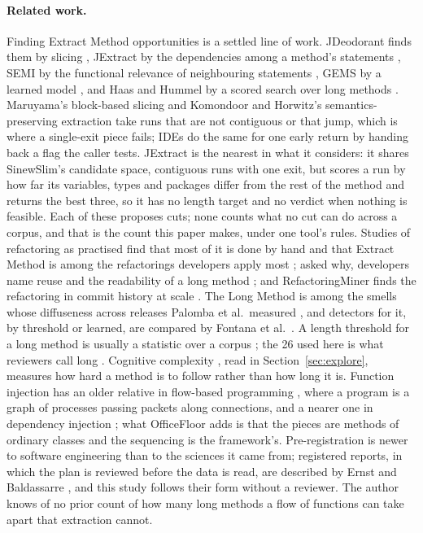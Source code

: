 \documentclass[11pt,a4paper]{article}
\begin{document}
\paragraph{Related work.} Finding Extract Method opportunities is a settled
line of work. JDeodorant finds them by slicing \cite{tsantalis2011}, JExtract
by the dependencies among a method's statements \cite{silva2014}, SEMI by the
functional relevance of neighbouring statements \cite{charalampidou2017},
GEMS by a learned model \cite{xu2017}, and Haas and Hummel by a scored search
over long methods \cite{haas2016}. Maruyama's block-based slicing
\cite{maruyama2001} and Komondoor and Horwitz's semantics-preserving
extraction \cite{komondoor2000} take runs that are not contiguous or that
jump, which is where a single-exit piece fails; IDEs do the same for one
early return by handing back a flag the caller tests. JExtract is the
nearest in what it considers: it shares SinewSlim's candidate space,
contiguous runs with one exit, but scores a run by how far its variables,
types and packages differ from the rest of the method and returns the best
three, so it has no length target and no verdict when nothing is feasible.
Each of these proposes cuts; none counts what no cut can do across a corpus,
and that is the count this paper makes, under one tool's rules. Studies of refactoring as practised
find that most of it is done by hand and that Extract Method is among the
refactorings developers apply most \cite{murphyhill2012}; asked why,
developers name reuse and the readability of a long method
\cite{silva2016}; and RefactoringMiner finds the refactoring in commit
history at scale \cite{tsantalis2018}. The Long Method is among the smells
whose diffuseness across releases Palomba et al.\ measured
\cite{palomba2018}, and detectors for it, by threshold or learned, are
compared by Fontana et al.\ \cite{fontana2016}. A length threshold for a long
method is usually a statistic over a corpus \cite{lanza2006}; the 26 used
here is what reviewers call long \cite{longmethod}. Cognitive complexity
\cite{campbell2018}, read in Section~\ref{sec:explore}, measures how hard a
method is to follow rather than how long it is. Function injection has an
older relative in flow-based programming \cite{morrison2010}, where a program
is a graph of processes passing packets along connections, and a nearer one
in dependency injection \cite{fowler2004}; what OfficeFloor adds is that the
pieces are methods of ordinary classes and the sequencing is the framework's.
Pre-registration is newer to software engineering than to the sciences it
came from; registered reports, in which the plan is reviewed before the data
is read, are described by Ernst and Baldassarre \cite{ernst2023}, and this
study follows their form without a reviewer. The author knows of no prior
count of how many long methods a flow of functions can take apart that
extraction cannot.
\end{document}
